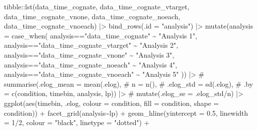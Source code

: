 \documentclass[
  letterpaper,
  DIV=11,
  numbers=noendperiod]{scrartcl}
\newenvironment{Shaded}{\begin{snugshade}}{\end{snugshade}}
\newcommand{\AttributeTok}[1]{\textcolor[rgb]{0.40,0.45,0.13}{#1}}
\newcommand{\CommentTok}[1]{\textcolor[rgb]{0.37,0.37,0.37}{#1}}
\newcommand{\DecValTok}[1]{\textcolor[rgb]{0.68,0.00,0.00}{#1}}
\newcommand{\FloatTok}[1]{\textcolor[rgb]{0.68,0.00,0.00}{#1}}
\newcommand{\FunctionTok}[1]{\textcolor[rgb]{0.28,0.35,0.67}{#1}}
\newcommand{\NormalTok}[1]{\textcolor[rgb]{0.00,0.23,0.31}{#1}}
\newcommand{\SpecialCharTok}[1]{\textcolor[rgb]{0.37,0.37,0.37}{#1}}
\newcommand{\StringTok}[1]{\textcolor[rgb]{0.13,0.47,0.30}{#1}}
\begin{document}
\begin{Shaded}
\begin{Highlighting}[]
\NormalTok{tibble}\SpecialCharTok{::}\FunctionTok{lst}\NormalTok{(data\_time\_cognate,}
\NormalTok{            data\_time\_cognate\_vtarget,}
\NormalTok{            data\_time\_cognate\_vnone,}
\NormalTok{            data\_time\_cognate\_noeach,}
\NormalTok{            data\_time\_cognate\_vnoeach) }\SpecialCharTok{|\textgreater{}} 
    \FunctionTok{bind\_rows}\NormalTok{(}\AttributeTok{.id =} \StringTok{"analysis"}\NormalTok{) }\SpecialCharTok{|\textgreater{}}
    \FunctionTok{mutate}\NormalTok{(}\AttributeTok{analysis =} \FunctionTok{case\_when}\NormalTok{(}
\NormalTok{        analysis}\SpecialCharTok{==}\StringTok{"data\_time\_cognate"} \SpecialCharTok{\textasciitilde{}} \StringTok{"Analysis 1"}\NormalTok{,}
\NormalTok{        analysis}\SpecialCharTok{==}\StringTok{"data\_time\_cognate\_vtarget"} \SpecialCharTok{\textasciitilde{}} \StringTok{"Analysis 2"}\NormalTok{,}
\NormalTok{        analysis}\SpecialCharTok{==}\StringTok{"data\_time\_cognate\_vnone"} \SpecialCharTok{\textasciitilde{}} \StringTok{"Analysis 3"}\NormalTok{,}
\NormalTok{        analysis}\SpecialCharTok{==}\StringTok{"data\_time\_cognate\_noeach"} \SpecialCharTok{\textasciitilde{}} \StringTok{"Analysis 4"}\NormalTok{,}
\NormalTok{        analysis}\SpecialCharTok{==}\StringTok{"data\_time\_cognate\_vnoeach"} \SpecialCharTok{\textasciitilde{}} \StringTok{"Analysis 5"}
\NormalTok{    )) }\SpecialCharTok{|\textgreater{}} 
    \CommentTok{\# summarise(.elog\_mean = mean(.elog),}
    \CommentTok{\#         n = n(),}
    \CommentTok{\#         .elog\_std = sd(.elog),}
    \CommentTok{\#         .by = c(condition, timebin, analysis, lp)) |\textgreater{}}
    \CommentTok{\# mutate(.elog\_se = .elog\_std/n) |\textgreater{} }
    \FunctionTok{ggplot}\NormalTok{(}\FunctionTok{aes}\NormalTok{(timebin, .elog,}
               \AttributeTok{colour =}\NormalTok{ condition,}
               \AttributeTok{fill =}\NormalTok{ condition,}
               \AttributeTok{shape =}\NormalTok{ condition)) }\SpecialCharTok{+}
    \FunctionTok{facet\_grid}\NormalTok{(analysis}\SpecialCharTok{\textasciitilde{}}\NormalTok{lp) }\SpecialCharTok{+}
    \FunctionTok{geom\_hline}\NormalTok{(}\AttributeTok{yintercept =} \FloatTok{0.5}\NormalTok{, }
               \AttributeTok{linewidth =} \DecValTok{1}\SpecialCharTok{/}\DecValTok{2}\NormalTok{,}
               \AttributeTok{colour =} \StringTok{"black"}\NormalTok{,}
               \AttributeTok{linetype =} \StringTok{"dotted"}\NormalTok{) }\SpecialCharTok{+}

\end{Highlighting}
\end{Shaded}
\end{document}
